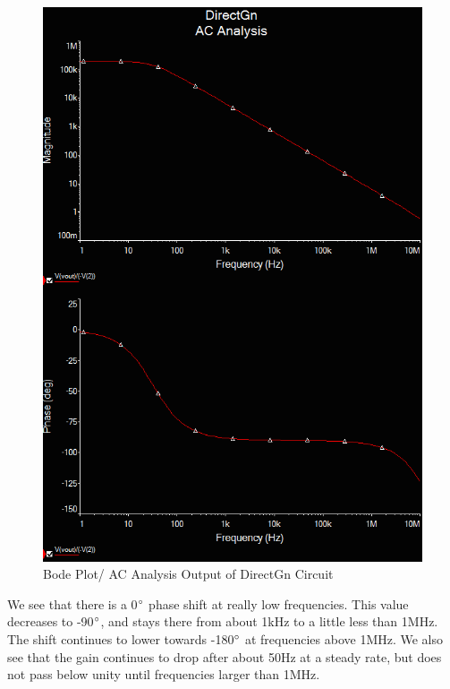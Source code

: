 \documentclass{article}
\begin{document}
    \begin{figure}[H]
        \centering
        \includegraphics[scale = 0.45]{14a.png}
        \caption{Bode Plot/ AC Analysis Output of DirectGn Circuit}
        \label{fig:my_label}
    \end{figure}
    We see that there is a 0$\degree$ phase shift at really low frequencies. This value decreases to -90$\degree$, and stays there from about 1kHz to a little less than 1MHz. The shift continues to lower towards -180$\degree$ at frequencies above 1MHz. We also see that the gain continues to drop after about 50Hz at a steady rate, but does not pass below unity until frequencies larger than 1MHz.

\end{document}
